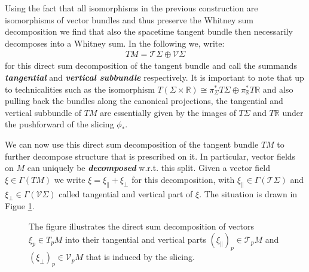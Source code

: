 Using the fact that all isomorphisms in the previous construction are isomorphisms of vector bundles and thus preserve the Whitney sum decomposition we find that also the spacetime tangent bundle then necessarily decomposes into a Whitney sum. In the following we, write:
\begin{align}
    TM = \mathcal{T}\Sigma \oplus \mathcal{V}\Sigma
\end{align} 
for this direct sum decomposition of the tangent bundle and call the summands \textit{\textbf{tangential}} and \textit{\textbf{vertical subbundle}} respectively.  
It is important to note that up to technicalities such as the isomorphism $T(\Sigma \times \mathbb{R}) \cong \pi_{\Sigma}^{\ast}T\Sigma \oplus \pi_{\mathbb{R}}^{\ast} T\mathbb{R}$ and also pulling back the bundles along the canonical projections, the tangential and vertical subbundle of $TM$ are essentially given by the images of $T\Sigma$ and $T\mathbb{R}$ under the pushforward of the slicing $\phi_{\ast}$. 

We can now use this direct sum decomposition of the tangent bundle $TM$ to further decompose structure that is prescribed on it.
In particular, vector fields on $M$ can uniquely be \textit{\textbf{decomposed}} w.r.t. this split. Given a vector field $\xi \in \Gamma(TM)$ we write $\xi = \xi_{\parallel} + \xi_{\perp} $ for this decomposition, with $\xi_{\parallel} \in \Gamma(\mathcal{T}\Sigma)$ and $\xi_{\perp} \in \Gamma(\mathcal{V}\Sigma)$ called tangential and vertical part of $\xi$. The situation is drawn in Figue \ref{DecompPic}.

\begin{figure}[hbt!]
\centering
{}
\caption[Direct Sum Decompostion of Vectors.]{The figure illustrates the direct sum decomposition of vectors $\xi_p \in T_pM$ into their tangential and vertical parts $(\xi_{\parallel})_p \in \mathcal{T}_pM$ and $(\xi_{\perp})_p \in \mathcal{V}_pM$ that is induced by the slicing. }\label{DecompPic}
\end{figure}

